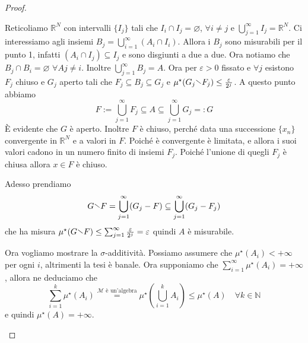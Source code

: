 \begin{proof}
\begin{enumerate}[label = \arabic*.]
        Reticoliamo \(\mathbb{R}^{N}\) con intervalli \(\{I_{j}\} \) tali che
        \(I_{i} \cap  I_{j} = \varnothing\), \(\forall i \neq j\) e
        \(\bigcup_{j=1}^{\infty} I_{j} = \mathbb{R}^{N} \). Ci interessiamo agli
        insiemi \(B_{j} = \bigcup_{i=1}^{\infty} (A_{i} \cap I_{i}) \). Allora i
        \(B_{j}\) sono misurabili per il punto 1, infatti \((A_{i} \cap I_{j})
        \subseteq I_{j} \)  e sono disgiunti a due a due. Ora notiamo che
        \(B_{j} \cap B_{i} = \varnothing\) \(\forall A j \neq i\). Inoltre
        \(\bigcup_{j = 1}^{\infty} B_{j} = A \). Ora per \(\varepsilon > 0\)
        fissato e \( \forall j\) esistono \(F_{j}\) chiuso e \(G_{j}\) aperto
        tali che \(F_{j} \subseteq B_{j} \subseteq G_{j}  \) e \(\mu^\star(G_{j}
        \sminus F_{j}) \le \frac{\varepsilon}{2^{j}}\). A questo punto abbiamo
        \[
            F := \bigcup_{j=1}^{\infty} F_{j} \subseteq A \subseteq
            \bigcup_{j=1}^{\infty} G_{j} =: G
        \]
        È evidente che \(G\) è aperto. Inoltre \(F\) è chiuso, perché data una
        successione \(\{x_{n}\} \) convergente in \(\mathbb{R}^{N}\) e a valori
        in \(F\). Poiché è convergente è limitata, e allora i suoi valori cadono
        in un numero finito di insiemi \(F_{j}\). Poiché l'unione di quegli
        \(F_{j}\) è chiusa allora \(x \in F\) è chiuso.

        Adesso prendiamo \[G \sminus F = \bigcup_{j=1}^{\infty}(G_{j} - F)
        \subseteq \bigcup_{j = 1}^{\infty} (G_{j} - F_{j}) \] che ha misura
        \(\mu^\star(G\sminus F) \le \sum_{j=1}^{\infty}
        \frac{\varepsilon}{2^{j}} = \varepsilon \) quindi \(A\) è misurabile.

        Ora vogliamo mostrare la \(\sigma\)-additività. Possiamo assumere che
        \(\mu^\star(A_{i}) < +\infty\) per ogni \(i\), altrimenti la tesi è
        banale. Ora supponiamo che \(\sum_{i=1}^{\infty} \mu^\star(A_{i}) =
        +\infty \), allora ne deduciamo che 
        \[
            \sum_{i=1}^{k} \mu^\star(A_{i}) \overset{\mathcal{M} \text{ è
            un'algebra}}{=} \mu^\star \left( \bigcup_{i=1}^{k}A_{i} \right) \le \mu^\star(A) \quad \forall k \in
            \mathbb{N}
        \]
        e quindi \(\mu^\star(A) = +\infty\).


\end{enumerate}
\end{proof}
